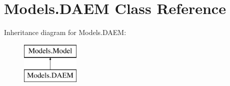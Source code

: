 \hypertarget{classModels_1_1DAEM}{\section{\-Models.\-D\-A\-E\-M \-Class \-Reference}
\label{classModels_1_1DAEM}
}
\-Inheritance diagram for \-Models.\-D\-A\-E\-M\-:\begin{figure}[H]
\begin{center}
\leavevmode
\includegraphics[height=2.000000cm]{classModels_1_1DAEM}
\end{center}
\end{figure}
